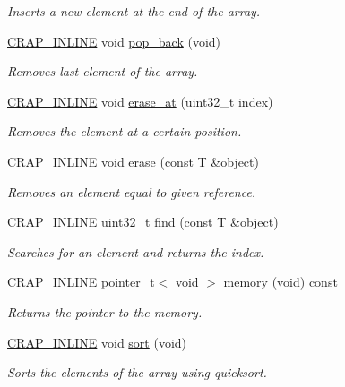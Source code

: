 \begin{DoxyCompactItemize}
\begin{DoxyCompactList}\small\item\em Inserts a new element at the end of the array. \end{DoxyCompactList}\item 
\hyperlink{config__x86_8h_a5a40526b8d842e7ff731509998bb0f1c}{C\+R\+A\+P\+\_\+\+I\+N\+L\+I\+N\+E} void \hyperlink{classcrap_1_1array_ae6c230d288cfe5934c6ee1e76e72474c}{pop\+\_\+back} (void)
\begin{DoxyCompactList}\small\item\em Removes last element of the array. \end{DoxyCompactList}\item 
\hyperlink{config__x86_8h_a5a40526b8d842e7ff731509998bb0f1c}{C\+R\+A\+P\+\_\+\+I\+N\+L\+I\+N\+E} void \hyperlink{classcrap_1_1array_ae0ac64a23e023c74e9765947d4c69560}{erase\+\_\+at} (uint32\+\_\+t index)
\begin{DoxyCompactList}\small\item\em Removes the element at a certain position. \end{DoxyCompactList}\item 
\hyperlink{config__x86_8h_a5a40526b8d842e7ff731509998bb0f1c}{C\+R\+A\+P\+\_\+\+I\+N\+L\+I\+N\+E} void \hyperlink{classcrap_1_1array_a34f587e9a5445845ae9a6802fa00fcee}{erase} (const T \&object)
\begin{DoxyCompactList}\small\item\em Removes an element equal to given reference. \end{DoxyCompactList}\item 
\hyperlink{config__x86_8h_a5a40526b8d842e7ff731509998bb0f1c}{C\+R\+A\+P\+\_\+\+I\+N\+L\+I\+N\+E} uint32\+\_\+t \hyperlink{classcrap_1_1array_a519c451e83aaae87fb21b9e6905f2235}{find} (const T \&object)
\begin{DoxyCompactList}\small\item\em Searches for an element and returns the index. \end{DoxyCompactList}\item 
\hyperlink{config__x86_8h_a5a40526b8d842e7ff731509998bb0f1c}{C\+R\+A\+P\+\_\+\+I\+N\+L\+I\+N\+E} \hyperlink{structcrap_1_1pointer__t}{pointer\+\_\+t}$<$ void $>$ \hyperlink{classcrap_1_1array_a7c1234696095b2e05343c9670c5a6ecd}{memory} (void) const 
\begin{DoxyCompactList}\small\item\em Returns the pointer to the memory. \end{DoxyCompactList}\item 
\hyperlink{config__x86_8h_a5a40526b8d842e7ff731509998bb0f1c}{C\+R\+A\+P\+\_\+\+I\+N\+L\+I\+N\+E} void \hyperlink{classcrap_1_1array_a6d0dce186d942103d3ee73773fda560d}{sort} (void)
\begin{DoxyCompactList}\small\item\em Sorts the elements of the array using quicksort. \end{DoxyCompactList}\end{DoxyCompactItemize}

